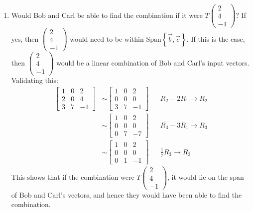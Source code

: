 \documentclass[10pt,letterpaper,final]{report}
\newcommand{\reason}[1]{&& \text{#1}}
\begin{document}
\begin{enumerate}[label=(\alph*)]
  \item Would Bob and Carl be able to find the combination if it were $T\begin{pmatrix}2\\4\\-1\end{pmatrix}$? If yes, then $\begin{pmatrix}2\\4\\-1\end{pmatrix}$ would need to be within $\text{Span}\left\{\vec{b}, \vec{c}\right\}$. If this is the case, then $\begin{pmatrix}2\\4\\-1\end{pmatrix}$ would be a linear combination of Bob and Carl's input vectors. Validating this:
        \begin{align*}
          \left[\begin{array}{rr|r}
              1 & 0 & 2  \\
              2 & 0 & 4  \\
              3 & 7 & -1
            \end{array}\right]
           & \sim \left[\begin{array}{rr|r}
                      1 & 0 & 2  \\
                      0 & 0 & 0  \\
                      3 & 7 & -1
                    \end{array}\right] \reason{$R_2 - 2R_1 \to R_2$}     \\[1ex]
           & \sim \left[\begin{array}{rr|r}
                      1 & 0 & 2  \\
                      0 & 0 & 0  \\
                      0 & 7 & -7
                    \end{array}\right] \reason{$R_3 - 3R_1 \to R_3$}     \\[1ex]
           & \sim \left[\begin{array}{rr|r}
                      1 & 0 & 2  \\
                      0 & 0 & 0  \\
                      0 & 1 & -1
                    \end{array}\right] \reason{$\frac{1}{7}R_3 \to R_3$}
        \end{align*}
        This shows that if the combination were $T\begin{pmatrix}2\\4\\-1\end{pmatrix}$, it would lie on the span of Bob and Carl's vectors, and hence they would have been able to find the combination.
\end{enumerate}
\end{document}
